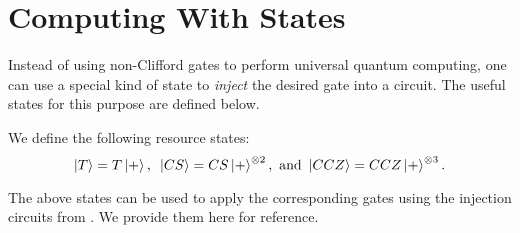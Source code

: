 \documentclass[12pt]{dalthesis}
\begin{document}
\section{Computing With States}
Instead of using non-Clifford gates to perform universal quantum computing, one can use a special kind of state to \emph{inject} the desired gate into a circuit. The useful states for this purpose are defined below.
\begin{definition}
We define the following resource states:
\begin{equation*}
\ket{T} = T\ket{+}, \mbox{ } \ket{CS} = CS \ket{+}^{\otimes 2}, \mbox{ and } \ket{CCZ} = CCZ \ket{+}^{\otimes 3}.
\end{equation*}
\end{definition}
The above states can be used to apply the corresponding gates using the injection circuits from \cite{beverland2019lower}. We provide them here for reference.
\end{document}
